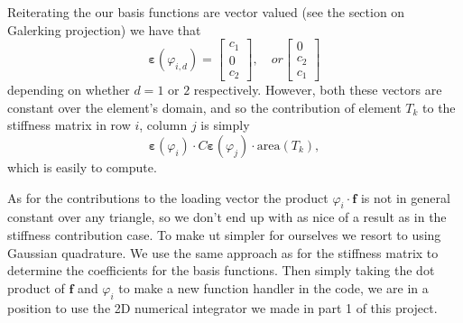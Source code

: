 \documentclass[paper=a4, fontsize=11pt]{scrartcl} %
\begin{document}
Reiterating the our basis functions are vector valued (see the section on Galerking projection) we have that
\begin{equation*}
\boldsymbol{\varepsilon}\left(\varphi_{\hat{i},d}\right) = \begin{bmatrix}
c_1 \\ 0 \\ c_2
\end{bmatrix}
, \quad or \begin{bmatrix}
0 \\ c_2 \\ c_1
\end{bmatrix}
\end{equation*}
depending on whether $d=1$ or $2$ respectively. However, both these vectors are constant over the element's domain, and so the contribution of element $T_k$ to the stiffness matrix in row $i$, column $j$ is simply
\begin{equation*}
\boldsymbol{\varepsilon}(\varphi_i)\cdot C \boldsymbol{\varepsilon}(\varphi_j)\cdot \text{area}(T_k),
\end{equation*}
which is easily to compute.

As for the contributions to the loading vector the product $\varphi_i\cdot \boldsymbol{f}$ is not in general constant over any triangle, so we don't end up with as nice of a result as in the stiffness contribution case. To make ut simpler for ourselves we resort to using Gaussian quadrature. We use the same approach as for the stiffness matrix to determine the coefficients for the basis functions. Then simply taking the dot product of $\boldsymbol{f}$ and $\varphi_i$ to make a new function handler in the code, we are in a position to use the 2D numerical integrator we made in part 1 of this project.
\end{document}
